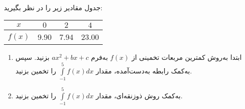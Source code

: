 \\
جدول مقادیر زیر را در نظر بگیرید:

\begin{latin}
\begin{table}[H]
  \begin{center}
    \begin{tabular}{c|c c c}
      \textbf{$x$} & $0$ & $2$ & $4$ \\
      \hline
      \textbf{$f(x)$} & 9.90 & 7.94 & 23.00 \\
    \end{tabular}
  \end{center}
\end{table}
\end{latin}

\begin{enumerate}
	\item
    ابتدا به‌روش
    کمترین مربعات
    تخمینی از
    $f(x)$
    به‌فرم
    $ax^2 + bx + c$
    بزنید.
    سپس به‌کمک رابطه به‌دست‌آمده،
    مقدار
    $\int\limits^5_{-1}f(x)dx$
    را تخمین بزنید.
    
    \item
    به‌کمک روش ذوزنقه‌ای،
    مقدار
    $\int\limits^5_{-1}f(x)dx$
    را تخمین بزنید.
\end{enumerate}
